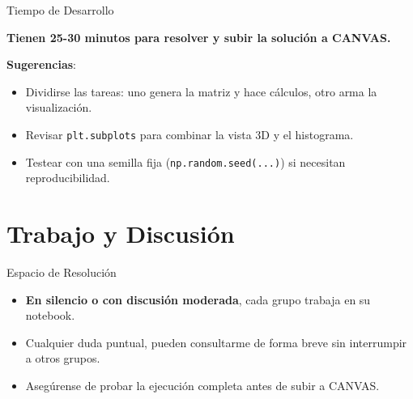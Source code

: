 \documentclass[10pt]{beamer}
\begin{document}
\begin{frame}{Tiempo de Desarrollo}
  \begin{block}{}
    \huge{\textbf{Tienen 25-30 minutos para resolver y subir la solución a CANVAS.}}
  \end{block}
  \vspace{0.3cm}
  \textbf{Sugerencias}:
  \begin{itemize}
    \item Dividirse las tareas: uno genera la matriz y hace cálculos, otro arma la visualización.
    \item Revisar \texttt{plt.subplots} para combinar la vista 3D y el histograma.
    \item Testear con una semilla fija (\texttt{np.random.seed(...)}) si necesitan reproducibilidad.
  \end{itemize}
\end{frame}

\section{Trabajo y Discusión}

\begin{frame}{Espacio de Resolución}
  \begin{itemize}
    \item \textbf{En silencio o con discusión moderada}, cada grupo trabaja en su notebook.
    \item Cualquier duda puntual, pueden consultarme de forma breve sin interrumpir a otros grupos.
    \item Asegúrense de probar la ejecución completa antes de subir a CANVAS.
  \end{itemize}
\end{frame}
\end{document}
